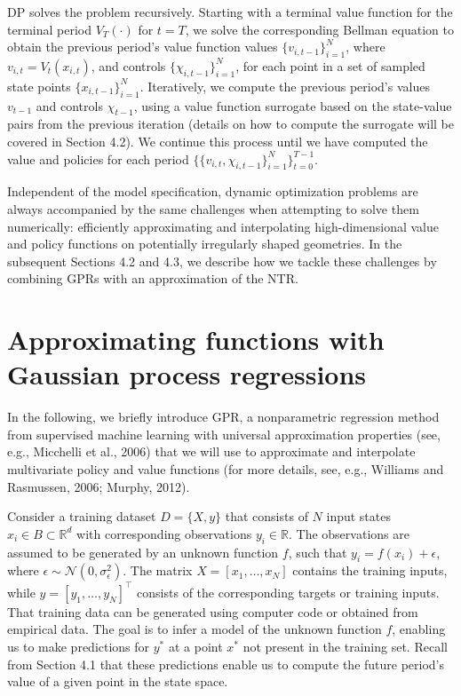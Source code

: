 \documentclass[10pt,a4paper]{article}
\numberwithin{equation}{section} %
\begin{document}
DP solves the problem recursively. Starting with a terminal value function for the
terminal period $V_T(\cdot)$ for $t = T$, we solve the corresponding Bellman equation to obtain
the previous period’s value function values $\{v_{i,t-1}\}_{i=1}^N$, where $v_{i,t} = V_t(x_{i,t})$, 
and controls $\{\chi_{i,t-1}\}_{i=1}^N$, for each point in a set of sampled state points 
$\{x_{i,t-1}\}_{i=1}^N$. Iteratively, we compute the previous period’s values $v_{t-1}$ and controls 
$\chi_{t-1}$, using a value function surrogate based on the state-value pairs from the previous 
iteration (details on how to compute the surrogate will be covered in Section 4.2). We continue 
this process until we have computed the value and policies for each period 
$\{ \{v_{i,t}, \chi_{i,t-1}\}_{i=1}^N \}_{t=0}^{T-1}$.

Independent of the model specification, dynamic optimization problems are always
accompanied by the same challenges when attempting to solve them numerically: efficiently 
approximating and interpolating high-dimensional value and policy functions on potentially 
irregularly shaped geometries. In the subsequent Sections 4.2 and 4.3, we describe how we tackle 
these challenges by combining GPRs with an approximation of the NTR.

\section{Approximating functions with Gaussian process regressions}
In the following, we briefly introduce GPR, a nonparametric regression method from
supervised machine learning with universal approximation properties (see, e.g., Micchelli et al., 2006) 
that we will use to approximate and interpolate multivariate policy and value functions (for more 
details, see, e.g., Williams and Rasmussen, 2006; Murphy, 2012).

Consider a training dataset $D = \{X, y\}$ that consists of $N$ input states 
$x_i \in B \subset \mathbb{R}^d$ with corresponding observations $y_i \in \mathbb{R}$. The observations 
are assumed to be generated by an unknown function $f$, such that $y_i = f(x_i) + \epsilon$, where 
$\epsilon \sim \mathcal{N}(0, \sigma_{\epsilon}^2)$. The matrix $X = [x_1, \ldots, x_N]$ contains the training 
inputs, while $y = [y_1, \ldots, y_N]^\top$ consists of the corresponding targets or training inputs. 
That training data can be generated using computer code or obtained from empirical data. The goal 
is to infer a model of the unknown function $f$, enabling us to make predictions for $y^*$ at a point 
$x^*$ not present in the training set. Recall from Section 4.1 that these predictions enable us to compute 
the future period’s value of a given point in the state space.
\end{document}
